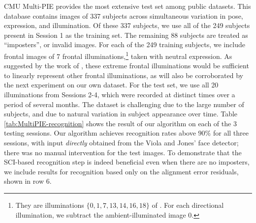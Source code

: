 \documentclass[12pt,journal,draftcls,letterpaper,onecolumn]{IEEEtran}
\begin{document}
CMU Multi-PIE provides the most extensive test set among public
datasets. This database contains images of 337 subjects across
simultaneous variation in pose, expression, and illumination.
Of these 337 subjects, we use all of the 249 subjects present
in Session 1 as the training set. The remaining 88 subjects are
treated as ``imposters'', or invalid images. For each of the
249 training subjects, we include frontal images of 7 frontal
illuminations,\footnote{They are illuminations
$\{0,1,7,13,14,16,18\}$ of \cite{Gross2008-FGR}. For each
directional illumination, we subtract the ambient-illuminated
image 0.} taken with neutral expression. As suggested by the
work of \cite{Georghiades2001-PAMI}, these extreme frontal
illuminations would be sufficient to linearly represent other
frontal illuminations, as will also be corroborated by the next
experiment on our own dataset. For the test set, we use all 20
illuminations from Sessions 2-4, which were recorded at
distinct times over a period of several months. The dataset is
challenging due to the large number of subjects, and due to
natural variation in subject appearance over time. Table
\ref{tab:MultiPIE-recognition} shows the result of our
algorithm on each of the 3 testing sessions. Our algorithm
achieves recognition rates above $90\%$ for all three sessions,
with input {\em directly} obtained from the Viola and Jones'
face detector; there was no manual intervention for the test images.
To demonstrate that the SCI-based recognition step is indeed beneficial
even when there are no imposters, we include results for recognition
based only on the alignment error residuals, shown in row 6.
\end{document}
